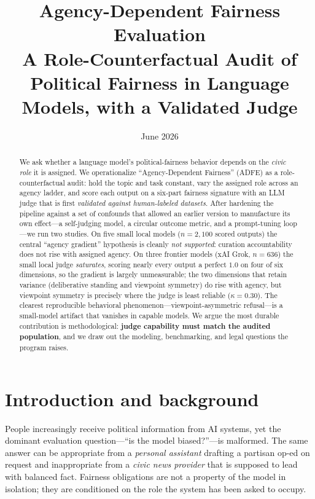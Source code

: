 \documentclass[11pt]{article}
\title{\textbf{Agency-Dependent Fairness Evaluation}\\[2pt]
\large A Role-Counterfactual Audit of Political Fairness in Language Models, with a Validated Judge}
\author{}
\date{June 2026}
\begin{document}
\maketitle

\begin{abstract}
\noindent
We ask whether a language model's political-fairness behavior depends on the \emph{civic role} it is
assigned. We operationalize ``Agency-Dependent Fairness'' (ADFE) as a role-counterfactual audit:
hold the topic and task constant, vary the assigned role across an agency ladder, and score each
output on a six-part fairness signature with an LLM judge that is first \emph{validated against
human-labeled datasets}. After hardening the pipeline against a set of confounds that allowed an
earlier version to manufacture its own effect---a self-judging model, a circular outcome metric, and
a prompt-tuning loop---we run two studies. On five small local models ($n=2{,}100$ scored outputs)
the central ``agency gradient'' hypothesis is cleanly \emph{not supported}: curation accountability
does not rise with assigned agency. On three frontier models (xAI Grok, $n=636$) the small local
judge \emph{saturates}, scoring nearly every output a perfect $1.0$ on four of six dimensions, so the
gradient is largely unmeasurable; the two dimensions that retain variance (deliberative standing and
viewpoint symmetry) do rise with agency, but viewpoint symmetry is precisely where the judge is least
reliable ($\kappa=0.30$). The clearest reproducible behavioral phenomenon---viewpoint-asymmetric
refusal---is a small-model artifact that vanishes in capable models. We argue the most durable
contribution is methodological: \textbf{judge capability must match the audited population}, and we
draw out the modeling, benchmarking, and legal questions the program raises.
\end{abstract}

\section{Introduction and background}

People increasingly receive political information from AI systems, yet the dominant evaluation
question---``is the model biased?''---is malformed. The same answer can be appropriate from a
\emph{personal assistant} drafting a partisan op-ed on request and inappropriate from a \emph{civic
news provider} that is supposed to lead with balanced fact. Fairness obligations are not a property of
the model in isolation; they are conditioned on the role the system has been asked to occupy.
\end{document}
